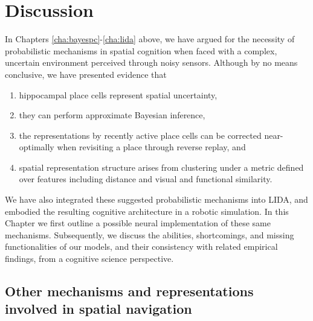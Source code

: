 \chapter{Discussion}
\label{cha:discussion}

In Chapters \ref{cha:bayespc}-\ref{cha:lida} above, we have argued for the necessity of probabilistic mechanisms in spatial cognition when faced with a complex, uncertain environment perceived through noisy sensors. Although by no means conclusive, we have presented evidence that

\begin{enumerate}
	\item hippocampal place cells represent spatial uncertainty, 
	\item they can perform approximate Bayesian inference,
	\item the representations by recently active place cells can be corrected near-optimally when revisiting a place through reverse replay, and
	\item spatial representation structure arises from clustering under a metric defined over features including distance and visual and functional similarity.
\end{enumerate}

We have also integrated these suggested probabilistic mechanisms into LIDA, and embodied the resulting cognitive architecture in a robotic simulation. In this Chapter we first outline a possible neural implementation of these same mechanisms. Subsequently, we discuss the abilities, shortcomings, and missing functionalities of our models, and their consistency with related empirical findings, from a cognitive science perspective. 


\section{Other mechanisms and representations involved in spatial navigation}


